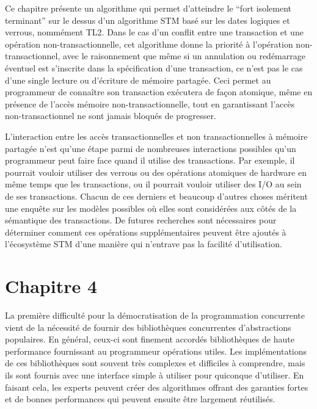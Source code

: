 Ce chapitre présente un algorithme qui permet d'atteindre le ``fort isolement terminant'' sur le dessus d'un algorithme STM basé sur les dates logiques et verrous, nommément TL2.
Dans le cas d'un conflit entre une transaction et une opération non-transactionnelle, cet algorithme donne la priorité à l'opération non-transactionnel,
avec le raisonnement que même si un annulation ou redémarrage éventuel est s'inscrite dans la spécification d'une transaction, ce n'est pas le cas d'une single lecture ou d'écriture de mémoire partagée.
Ceci permet au programmeur de connaître son transaction exécutera de façon atomique, même en présence de l'accès mémoire non-transactionnelle,
tout en garantissant l'accès non-transactionnel ne sont jamais bloqués de progresser.



L'interaction entre les accès transactionnelles et non transactionnelles à mémoire partagée n'est qu'une étape parmi de nombreuses interactions possibles qu'un programmeur peut faire face quand il utilise des transactions.
Par exemple, il pourrait vouloir utiliser des verrous ou des opérations atomiques de hardware en même temps que les transactions, ou il pourrait vouloir utiliser des I/O au sein de ses transactions.
Chacun de ces derniers et beaucoup d'autres choses méritent une enquête sur les modèles possibles où elles sont considérées aux côtés de la sémantique des transactions.
De futures recherches sont nécessaires pour déterminer comment ces opérations supplémentaires peuvent être ajoutés à l'écosystème STM d'une manière qui n'entrave pas la facilité d'utilisation.



\section*{Chapitre 4}
La première difficulté pour la démocratisation de la programmation concurrente vient de la nécessité de fournir des bibliothèques concurrentes d'abstractions populaires.
En général, ceux-ci sont finement accordés bibliothèques de haute performance fournissant au programmeur opérations utiles.
Les implémentations de ces bibliothèques sont souvent très complexes et difficiles à comprendre, mais ils sont fournis avec une interface simple à utiliser pour quiconque d'utiliser.
En faisant cela, les experts peuvent créer des algorithmes offrant des garanties fortes et de bonnes performances qui peuvent ensuite être largement réutilisés.


